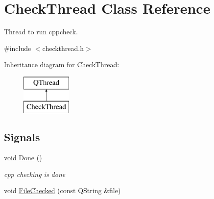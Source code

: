 \hypertarget{class_check_thread}{\section{Check\-Thread Class Reference}
\label{class_check_thread}
}


Thread to run cppcheck.  




{\ttfamily \#include $<$checkthread.\-h$>$}

Inheritance diagram for Check\-Thread\-:\begin{figure}[H]
\begin{center}
\leavevmode
\includegraphics[height=2.000000cm]{class_check_thread}
\end{center}
\end{figure}
\subsection*{Signals}
\begin{DoxyCompactItemize}
\item 
void \hyperlink{class_check_thread_ae97f628205a64aca5ebb0054b502b0c5}{Done} ()
\begin{DoxyCompactList}\small\item\em cpp checking is done \end{DoxyCompactList}\item 
void \hyperlink{class_check_thread_a71f38e4be443cc220b298e6c230a8e50}{File\-Checked} (const Q\-String \&file)
\end{DoxyCompactItemize}
